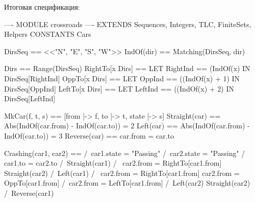 \documentclass[14pt, openany]{book}
\begin{document}
Итоговая спецификация:
\begin{tla}
  ---- MODULE crossroads ----
EXTENDS Sequences, Integers, TLC, FiniteSets, Helpers
CONSTANTS Cars

DirsSeq == <<"N", "E", "S", "W">>
IndOf(dir) == Matching(DirsSeq, dir)

Dirs == Range(DirsSeq)
RightTo[x \in Dirs] == 
  LET RightInd == (IndOf(x) %
  IN DirsSeq[RightInd]
OppTo[x \in Dirs] ==
  LET OppInd == ((IndOf(x) + 1) %
  IN DirsSeq[OppInd]
LeftTo[x \in Dirs] == 
  LET LeftInd == ((IndOf(x) + 2) %
  IN DirsSeq[LeftInd] 

MkCar(f, t, s) == [from |-> f, to |-> t, state |-> s]
Straight(car) == Abs(IndOf(car.from) - IndOf(car.to)) = 2
Left(car) == Abs(IndOf(car.from) - IndOf(car.to)) = 3
Reverse(car) == car.from = car.to
  
Crashing(car1, car2) == 
  /\ car1.state = "Passing" 
  /\ car2.state = "Passing" 
  /\ \/ car1.to = car2.to  
     \/ /\ Straight(car1) 
        /\ \/ car2.from = RightTo[car1.from] 
           \/ Straight(car2)
     \/ /\ Left(car1)
        /\ \/ car2.from = RightTo[car1.from]
           \/ car2.from = OppTo[car1.from]
           \/ /\ car2.from = LeftTo[car1.from]
              /\ Left(car2) \/ Straight(car2)
     \/ /\ Reverse(car1)     
\end{tla}
\end{document}
